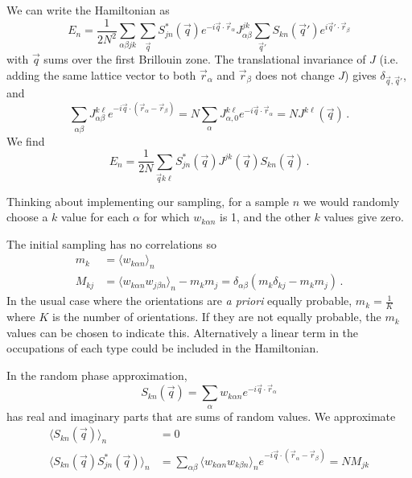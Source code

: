 \documentclass[12pt]{article}
\begin{document}
We can write the Hamiltonian as
\begin{equation}
E_n = \frac{1}{2N^2}\sum_{\alpha\beta jk}
\sum_{\vec q} S^*_{jn}(\vec q) e^{-i\vec q\cdot \vec r_\alpha}
J^{jk}_{\alpha\beta} \sum_{\vec q'} S_{kn}(\vec q')
e^{i\vec q'\cdot\vec r_\beta}
\end{equation}
with $\vec q$ sums over the first Brillouin zone. The translational
invariance of $J$ (i.e. adding the same lattice vector to both
$\vec r_\alpha$ and $\vec r_\beta$ does not change $J$) gives
$\delta_{\vec q,\vec q'}$,
and
\begin{equation}
\sum_{\alpha\beta} J^{k\ell}_{\alpha\beta}
e^{-i\vec q\cdot(\vec r_\alpha-\vec r_\beta)}
= N\sum_\alpha J^{k\ell}_{\alpha,0} e^{-i\vec q\cdot\vec r_\alpha}
=
N J^{k \ell}(\vec q) \,.
\end{equation}
We find
\begin{equation}
E_n = \frac{1}{2N}\sum_{\vec q k\ell}
S^*_{jn}(\vec q) J^{jk}(\vec q) S_{kn}(\vec q) \,.
\end{equation}

Thinking about implementing our sampling, for a sample $n$
we would randomly choose a $k$ value for each $\alpha$ for which
$w_{k\alpha n}$ is 1, and the other $k$ values give zero.

The initial sampling has no correlations so
\begin{equation}
\begin{split}
m_k &=\langle w_{k\alpha n} \rangle_n
\\
M_{kj} &= \langle w_{k\alpha n}w_{j\beta n}\rangle_n-m_k m_j =
\delta_{\alpha\beta}
\left (m_k \delta_{kj}-m_k m_j\right ) \,.
\end{split}
\end{equation}
In the usual case where
the orientations are {\em a priori} equally probable, $m_k = \frac{1}{K}$
where $K$ is the number of orientations. If they are not equally
probable, the $m_k$ values can be chosen to indicate this.
Alternatively a linear term in
the occupations of each type could be included in the Hamiltonian.

In the random phase approximation,
\begin{equation}
S_{kn}(\vec q) = \sum_\alpha w_{k\alpha n} e^{-i\vec q \cdot \vec r_\alpha}
\end{equation}
has real and imaginary parts that are
sums of random values. We approximate
\begin{equation}
\begin{split}
\langle S_{kn}(\vec q)\rangle_n &= 0
\\
\langle S_{kn}(\vec q)S^*_{jn}(\vec q)\rangle_n &= 
\sum_{\alpha\beta} \langle w_{k\alpha n} w_{k\beta n}\rangle_n
e^{-i\vec q \cdot 
(\vec r_\alpha-\vec r_\beta)} = NM_{jk}
\end{split}
\end{equation}
\end{document}
